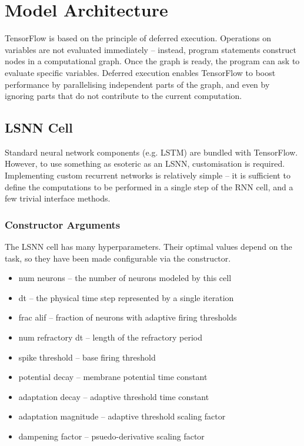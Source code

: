 \documentclass[../../report.tex]{subfiles}
\begin{document}
\section{Model Architecture}

TensorFlow is based on the principle of deferred execution\footnotemark{}.
Operations on variables are not evaluated immediately -- instead, program
statements construct nodes in a computational graph. Once the graph is ready,
the program can ask to evaluate specific variables. Deferred execution enables
TensorFlow to boost performance by parallelising independent parts of the graph,
and even by ignoring parts that do not contribute to the current computation.



\subsection{LSNN Cell}

Standard neural network components (e.g. LSTM) are bundled with TensorFlow.
However, to use something as esoteric as an LSNN, customisation is required.
Implementing custom recurrent networks is relatively simple -- it is sufficient
to define the computations to be performed in a single step of the RNN cell, and
a few trivial interface methods.

\subsubsection{Constructor Arguments}

The LSNN cell has many hyperparameters. Their optimal values depend on the task,
so they have been made configurable via the constructor.

\begin{itemize}
  \item num neurons -- the number of neurons modeled by this cell
  \item dt -- the physical time step represented by a single iteration
  \item frac alif -- fraction of neurons with adaptive firing thresholds
  \item num refractory dt -- length of the refractory period
  \item spike threshold -- base firing threshold
  \item potential decay -- membrane potential time constant 
  \item adaptation decay -- adaptive threshold time constant 
  \item adaptation magnitude -- adaptive threshold scaling factor
  \item dampening factor -- psuedo-derivative scaling factor 
\end{itemize}
\end{document}
